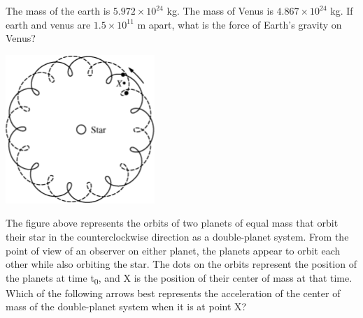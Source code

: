 \documentclass[10pt]{examdesign}
\begin{document}
\begin{multiplechoice} [title={Multiple Choice},
	rearrange=no]
\begin{question}
	The mass of the earth is $5.972 \times 10^{24}$ kg.  The mass of Venus is $4.867 \times 10^{24}$ kg.  If earth and venus are $1.5 \times 10^{11}$ m apart, what is the force of Earth's gravity on Venus?
	
	\end{question}


\begin{question}
	\begin{center}
		\includegraphics[height=.75in]{doubleplanet.png}
	\end{center}
The figure above represents the orbits of two planets of equal mass that orbit their star in the counterclockwise direction as a double-planet system. From the point of view of an observer on either planet, the planets appear to orbit each other while also orbiting the star. The dots on the orbits represent the position of the planets at time t\textsubscript{0}, and X is the position of their center of mass at that time. Which of the following arrows best represents the acceleration of the center of mass of the double-planet system when it is at point X?
 \choice{$\nwarrow$}
 \choice{$\swarrow$}
 \choice{$\nearrow$}
 \choice{$\searrow$}
\end{question}




%
\end{multiplechoice} 


%	
\end{document}
